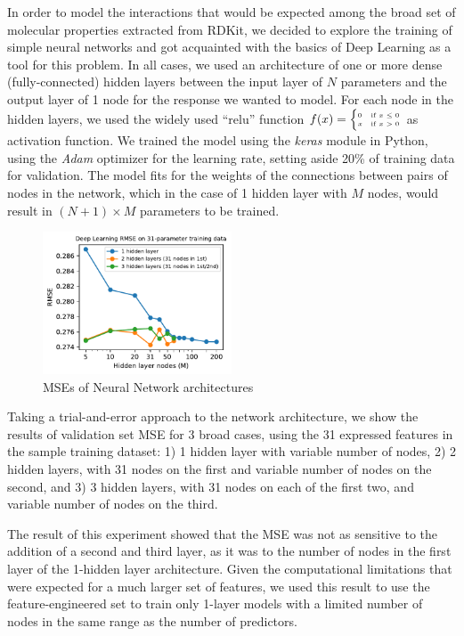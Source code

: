 \documentclass[11pt]{article}
\begin{document}
In order to model the interactions that would be expected among the broad set of molecular properties extracted from RDKit, we decided to explore the training of simple neural networks and got acquainted with the basics of Deep Learning as a tool for this problem. In all cases, we used an architecture of one or more dense (fully-connected) hidden layers between the input layer of $N$ parameters and the output layer of 1 node for the response we wanted to model. For each node in the hidden layers, we used the widely used ``relu'' function $ f(x) = {\tiny \begin{cases} 0 & \text{if } x \le 0 \\ x & \text{if } x>0 \end{cases}}$ as activation function. We trained the model using the \emph{keras} module in Python, using the \emph{Adam} optimizer for the learning rate, setting aside 20\% of training data for validation. The model fits for the weights of the connections between pairs of nodes in the network, which in the case of 1 hidden layer with $M$ nodes, would result in $(N + 1) \times M$ parameters to be trained.
\begin{figure}
\centering
\includegraphics[width=0.5\textwidth]{DL_mse_AC.pdf}
\caption{MSEs of Neural Network architectures}
\label{fig:DL_mse}
\end{figure}

Taking a trial-and-error approach to the network architecture, we show the results of validation set MSE for 3 broad cases, using the 31 expressed features in the sample training dataset: 1) 1 hidden layer with variable number of nodes, 2) 2 hidden layers, with 31 nodes on the first and variable number of nodes on the second, and 3) 3 hidden layers, with 31 nodes on each of the first two, and variable number of nodes on the third.

The result of this experiment showed that the MSE was not as sensitive to the addition of a second and third layer, as it was to the number of nodes in the first layer of the 1-hidden layer architecture. Given the computational limitations that were expected for a much larger set of features, we used this result to use the feature-engineered set to train only 1-layer models with a limited number of nodes in the same range as the number of predictors.
\end{document}
